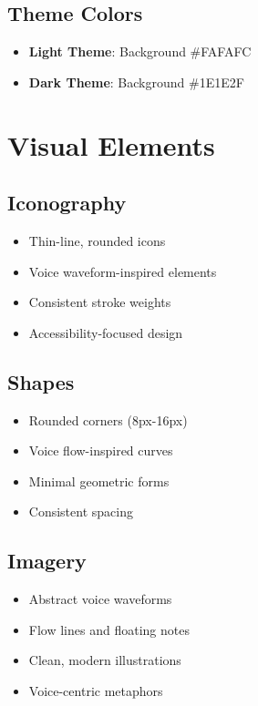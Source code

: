 \subsection{Theme Colors}
\begin{itemize}
    \item \textbf{Light Theme}: Background \#FAFAFC
    \item \textbf{Dark Theme}: Background \#1E1E2F
\end{itemize}

\section{Visual Elements}
\subsection{Iconography}
\begin{itemize}
    \item Thin-line, rounded icons
    \item Voice waveform-inspired elements
    \item Consistent stroke weights
    \item Accessibility-focused design
\end{itemize}

\subsection{Shapes}
\begin{itemize}
    \item Rounded corners (8px-16px)
    \item Voice flow-inspired curves
    \item Minimal geometric forms
    \item Consistent spacing
\end{itemize}

\subsection{Imagery}
\begin{itemize}
    \item Abstract voice waveforms
    \item Flow lines and floating notes
    \item Clean, modern illustrations
    \item Voice-centric metaphors
\end{itemize}

